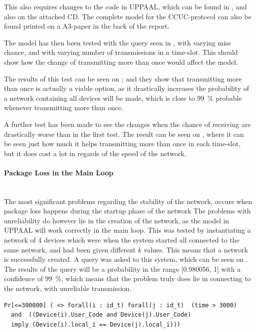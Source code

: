 This also requires changes to the code in UPPAAL, which can be found in , and also on the attached CD.
The complete model for the CCUC-protocol can also be found printed on a A3-paper in the back of the report.

The model has then been tested with the query seen in , with varying miss chance, and with varying number of transmissions in a time-slot.
This should show how the change of transmitting more than once would affect the model.

The results of this test can be seen on ; and they show that transmitting more than once is actually a viable option, as it drastically increases the probability of a network containing all devices will be made, which is close to 99~\% probable whenever transmitting more than once.

A further test has been made to see the changes when the chance of receiving are drastically worse than in the first test.
The result can be seen on , where it can be seen just how much it helps transmitting more than once in each time-slot, but it does cost a lot in regards of the speed of the network.

\paragraph{Package Loss in the Main Loop}\hfill \\
The most significant problems regarding the stability of the network, occurs when package loss happens during the startup phase of the network
The problems with unreliability do however lie in the creation of the network, as the model in UPPAAL will work correctly in the main loop.
This was tested by instantiating a network of 4 devices which were when the system started all connected to the same network, and had been given different $k$ values. 
This means that a network is successfully created.
A query was asked to this system, which can be seen on .
The results of the query will be a probability in the range [0.980056, 1] with a confidence of 99~\%, which means that the problem truly does lie in connecting to the network, with unreliable transmission. 

\begin{lstlisting}[style=UPPAAL, caption={Query for UPPAAL asking if for all devices i and j, when they are in the location \texttt{User\_Code} will they have they then have the same value for \texttt{local\_i}.}, label={stable-network-query}, float=p]
Pr[<=300000] ( <> forall(i : id_t) forall(j : id_t)  (time > 3000) 
  and  ((Device(i).User_Code and Device(j).User_Code) 
  imply (Device(i).local_i == Device(j).local_i)))
\end{lstlisting} 
 
